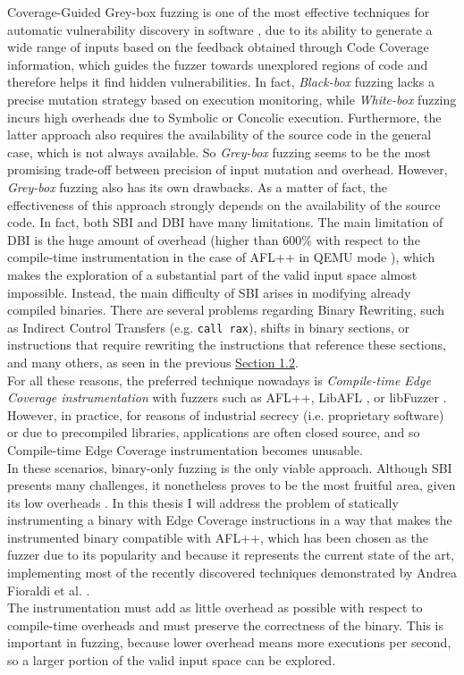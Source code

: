 Coverage-Guided Grey-box fuzzing is one of the most effective techniques for automatic vulnerability discovery in software
    \cite{zafl,Boehme2016},
    due to its ability to generate a wide range of inputs based on the feedback obtained through Code Coverage information,
    which guides the fuzzer towards unexplored regions of code and therefore helps it find hidden vulnerabilities.
    In fact, \textit{Black-box} fuzzing lacks a precise mutation strategy based on execution monitoring, while
    \textit{White-box} fuzzing incurs high overheads due to Symbolic or Concolic execution.
    Furthermore, the latter approach also requires the availability of the source code in the general case, 
    which is not always available.
    So \textit{Grey-box} fuzzing seems to be the most promising trade-off between precision of input mutation and overhead.
    However, \textit{Grey-box} fuzzing also has its own drawbacks.
    As a matter of fact, the effectiveness of this approach strongly depends on the availability of the source code.
    In fact, both \gls{SBI} and \gls{DBI} have many limitations.
    The main limitation of \gls{DBI} is the huge amount of overhead (higher than 600\% with respect to the compile-time 
    instrumentation in the case of AFL++ in QEMU mode \cite{zafl}), which makes the exploration of a substantial part
    of the valid input space almost impossible.
    Instead, the main difficulty of \gls{SBI} arises in modifying already compiled binaries.
    There are several problems regarding Binary Rewriting, such as Indirect Control Transfers (e.g. \texttt{call rax}),
    shifts in binary sections, or instructions that require rewriting the instructions that reference these sections, and many others,
    as seen in the previous \hyperref[sec:biniary_rewriting]{Section 1.2}.\\
    For all these reasons, the preferred technique nowadays is \textit{Compile-time Edge Coverage instrumentation} with fuzzers such as
    AFL++, LibAFL \cite{libafl}, or libFuzzer \cite{libfuzzer}.
    However, in practice, for reasons of industrial secrecy (i.e. proprietary software) or due to precompiled libraries, applications are
    often closed source, and so Compile-time Edge Coverage instrumentation becomes unusable.\\
    In these scenarios, binary-only fuzzing is the only viable approach.
    Although \gls{SBI} presents many challenges, it nonetheless proves to be the most fruitful area,
    given its low overheads \cite{zafl}.
    In this thesis I will address the problem
    of statically instrumenting a binary with Edge Coverage instructions in a way that makes the instrumented binary compatible with AFL++,
    which has been chosen as the fuzzer due to its popularity and because it represents the current state of the art, implementing
    most of the recently discovered techniques demonstrated by Andrea Fioraldi et al. \cite{aflplusplus}.\\
    The instrumentation must add as little overhead as possible with respect to compile-time overheads and must
    preserve the correctness of the binary. This is important in fuzzing, because lower overhead means more executions per second,
    so a larger portion of the valid input space can be explored.